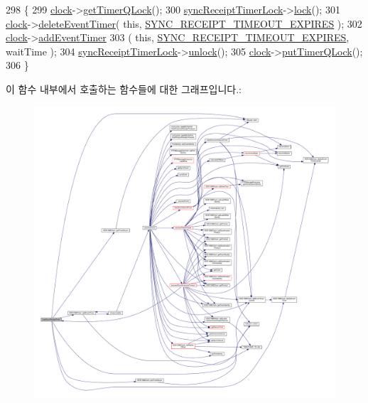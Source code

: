 \begin{DoxyCode}
298 \{
299     \hyperlink{class_common_port_aa2bc8731fa5aeb5b033feebc2b67258c}{clock}->\hyperlink{class_i_e_e_e1588_clock_a9d96aae524ab7f346d2c86dad94da7ca}{getTimerQLock}();
300     \hyperlink{class_common_port_af6298459c1a6d07a1e3538e4c5698e29}{syncReceiptTimerLock}->\hyperlink{class_o_s_lock_a9186992157d223030a002f3aded7aba2}{lock}();
301     \hyperlink{class_common_port_aa2bc8731fa5aeb5b033feebc2b67258c}{clock}->\hyperlink{class_i_e_e_e1588_clock_a19032512985731e4b13c15e47b95b548}{deleteEventTimer}( \textcolor{keyword}{this}, 
      \hyperlink{ieee1588_8hpp_a5667b805d857c6d28f83f6038a0272d3ac09ed008614f57d58759e4fd5a3c9622}{SYNC\_RECEIPT\_TIMEOUT\_EXPIRES} );
302     \hyperlink{class_common_port_aa2bc8731fa5aeb5b033feebc2b67258c}{clock}->\hyperlink{class_i_e_e_e1588_clock_a71199e4f44e22d308f9328255d80c896}{addEventTimer}
303         ( \textcolor{keyword}{this}, \hyperlink{ieee1588_8hpp_a5667b805d857c6d28f83f6038a0272d3ac09ed008614f57d58759e4fd5a3c9622}{SYNC\_RECEIPT\_TIMEOUT\_EXPIRES}, waitTime );
304     \hyperlink{class_common_port_af6298459c1a6d07a1e3538e4c5698e29}{syncReceiptTimerLock}->\hyperlink{class_o_s_lock_a5b965df44250112cac3cf967dc998bec}{unlock}();
305     \hyperlink{class_common_port_aa2bc8731fa5aeb5b033feebc2b67258c}{clock}->\hyperlink{class_i_e_e_e1588_clock_adbd19a2ad2cb62d2615c5a76da8193f1}{putTimerQLock}();
306 \}
\end{DoxyCode}


이 함수 내부에서 호출하는 함수들에 대한 그래프입니다.\+:
\nopagebreak
\begin{figure}[H]
\begin{center}
\leavevmode
\includegraphics[width=350pt]{class_common_port_a25bf37b5026e4b86b138498915330656_cgraph}
\end{center}
\end{figure}




